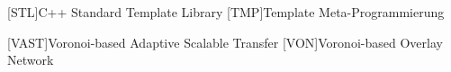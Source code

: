 \begin{acronym}[xxxxxxxxxxxx]
	\vspace{\parsep}
	[STL]{C++ Standard Template Library}
	\vspace{\parsep}
	[TMP]{Template Meta-Programmierung}

	\vspace{\parsep}
	[VAST]{Voronoi-based Adaptive Scalable Transfer}
	[VON]{Voronoi-based Overlay Network}





\end{acronym}
